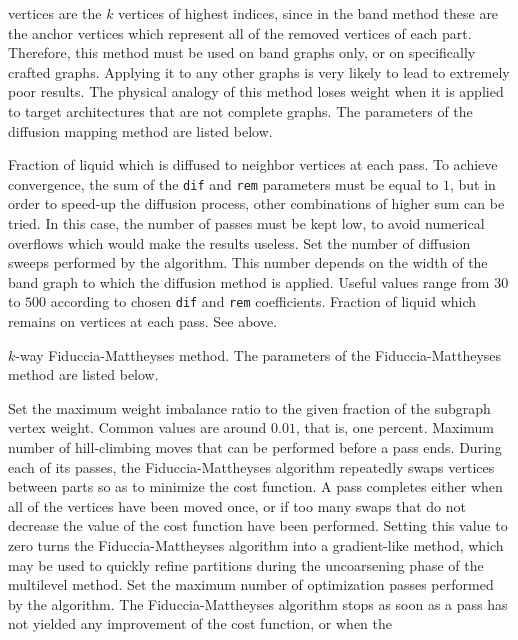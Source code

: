 \begin{itemize}
vertices are the $k$ vertices of highest indices, since in the band
method these are the anchor vertices which represent all of the removed
vertices of each part. Therefore, this method must be used on band
graphs only, or on specifically crafted graphs. Applying it to any
other graphs is very likely to lead to extremely poor results.
The physical analogy of this method loses weight when it is applied to
target architectures that are not complete graphs.
The parameters of the diffusion mapping method are listed below.
\begin{itemize}
\iteme[{\tt dif=}{\it rat}]
Fraction of liquid which is diffused to neighbor vertices at each
pass. To achieve convergence, the sum of the {\tt dif} and {\tt rem}
parameters must be equal to $1$, but in order to speed-up the diffusion
process, other combinations of higher sum can be tried. In this case,
the number of passes must be kept low, to avoid numerical overflows
which would make the results useless.
\iteme[{\tt pass=}{\it nbr}]
Set the number of diffusion sweeps performed by the algorithm. This
number depends on the width of the band graph to which the diffusion
method is applied. Useful values range from $30$ to $500$ according
to chosen {\tt dif} and {\tt rem} coefficients.
\iteme[{\tt rem=}{\it rat}]
Fraction of liquid which remains on vertices at each pass. See above.
\end{itemize}
\iteme[{\tt f}]
$k$-way Fiduccia-Mattheyses method. The parameters of the
Fiduccia-Mattheyses method are listed below.
\begin{itemize}
\iteme[{\tt bal=}{\it rat}]
Set the maximum weight imbalance ratio to the given fraction of
the subgraph vertex weight. Common values are around $0.01$, that
is, one percent.
\iteme[{\tt move=}{\it nbr}]
Maximum number of hill-climbing moves that can be performed before a
pass ends. During each of its passes, the Fiduccia-Mattheyses
algorithm repeatedly swaps vertices between parts so as to
minimize the cost function. A pass completes either when all of the
vertices have been moved once, or if too many swaps that do not
decrease the value of the cost function have been performed. Setting
this value to zero turns the Fiduccia-Mattheyses algorithm into a
gradient-like method, which may be used to quickly refine partitions
during the uncoarsening phase of the multilevel method.
\iteme[{\tt pass=}{\it nbr}]
Set the maximum number of optimization passes performed by the
algorithm. The Fiduccia-Mattheyses algorithm stops as soon as a pass
has not yielded any improvement of the cost function, or when the

\end{itemize}
\end{itemize}
